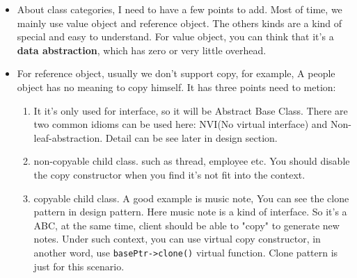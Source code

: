 \documentclass[a4paper,11pt,twoside]{book}
\begin{document}
\begin{itemize}
\begin{enumerate}
\begin{lstlisting}[numbers=none]
template <class T>
T f(T i){
	static_assert(std::is_integral<T>::value, "Int required.");
	return i;
}

std::cout << f(123) << '\n'; //output 123
\end{lstlisting}

    \item exception class. They are thrown by value but should be caught by reference. 

		\item Ancillary classes typically support specific idioms. such as RAII.  types that express unique ownership of a resource, such as \texttt{std::unique\_ptr}, are naturally move-only types, because they are not value-like (it doesn't make sense to copy them) but you do use them directly (not always by pointer or reference) and so want to move objects of this type around from one place to another.	

        \item Functor class, includes lambda. with operator() defined. This becomes more and more importants and win a seat in this list. 
	\end{enumerate}
    \item About class categories, I need to have a few points to add. Most of time, we mainly use value object and reference object. The others kinds are a kind of special and easy to understand. For value object, you can think that it's a \textbf{data abstraction}, which has zero or very little overhead. 
    \item For reference object, usually we don't support copy, for example, A people object has no meaning to copy himself. It has three points need to metion:
        \begin{enumerate}
            \item It it's only used for interface, so it will be Abstract Base Class. There are two common idioms can be used here: NVI(No virtual interface) and Non-leaf-abstraction. Detail can be see later in design section. 

            \item non-copyable child class. such as thread, employee etc. You should disable the copy constructor when you find it's not fit into the context.

            \item copyable child class. A good example is music note, You can see the clone pattern in design pattern. Here music note is a kind of interface. So it's a ABC, at the same time, client should be able to "copy" to generate new notes. Under such context, you can use virtual copy constructor, in another word, use \texttt{basePtr->clone()} virtual function. Clone pattern is just for this scenario. 

        \end{enumerate}
\end{itemize}
\end{document}
